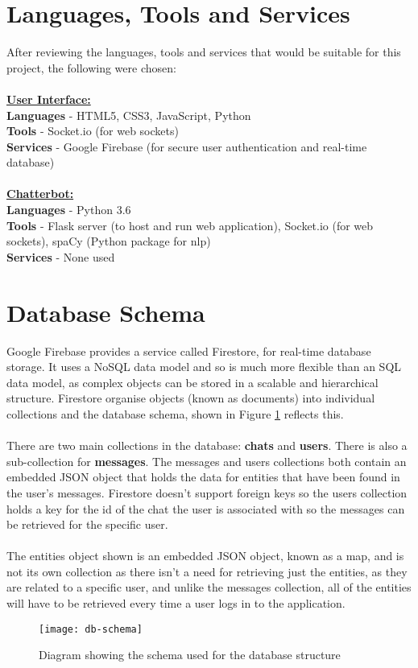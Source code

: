 \section{Languages, Tools and Services}
After reviewing the languages, tools and services that would be suitable for this project, the following were chosen:\\\\
\textbf{\underline{User Interface:}}\\
\textbf{Languages} - HTML5, CSS3, JavaScript, Python\\
\textbf{Tools} - Socket.io (for web sockets)\\
\textbf{Services} - Google Firebase (for secure user authentication and real-time database)\\\\
\textbf{\underline{Chatterbot:}}\\
\textbf{Languages} - Python 3.6\\
\textbf{Tools} - Flask server (to host and run web application), Socket.io (for web sockets), spaCy (Python package for \gls{nlp})\\
\textbf{Services} - None used\\
\section{Database Schema}
Google Firebase provides a service called Firestore, for real-time database storage. It uses a NoSQL data model and so is much more flexible than an SQL data model, as complex objects can be stored in a scalable and hierarchical structure. Firestore organise objects (known as documents) into individual collections and the database schema, shown in Figure \ref{fig:db-schema} reflects this.\\\\ 
There are two main collections in the database: \textbf{chats} and \textbf{users}. There is also a sub-collection for \textbf{messages}. The messages and users collections both contain an embedded JSON object that holds the data for entities that have been found in the user's messages. Firestore doesn't support foreign keys so the users collection holds a key for the id of the chat the user is associated with so the messages can be retrieved for the specific user.\\\\
The entities object shown is an embedded JSON object, known as a map, and is not its own collection as there isn't a need for retrieving just the entities, as they are related to a specific user, and unlike the messages collection, all of the entities will have to be retrieved every time a user logs in to the application. \\
\begin{figure}[h]
	\centering
	\texttt{[image: db-schema]}
	\caption{Diagram showing the schema used for the database structure}
	\label{fig:db-schema}
\end{figure}
